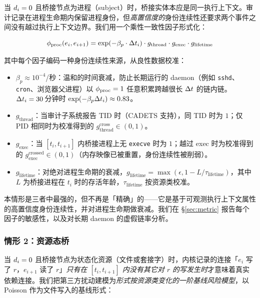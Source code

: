 当 $d_i = 0$ 且桥接节点为进程（subject）时，桥接实体本应是同一执行上下文。审计记录在进程生命期内保留进程身份，但\emph{高置信度的}身份连续性还要求两个事件之间没有越过执行上下文边界。我们用一个乘性一致性因子形式化：

\begin{equation}
\phi_{\text{proc}}(e_i, e_{i+1}) = \exp(-\beta_p \cdot \Delta t_i) \cdot g_{\text{thread}} \cdot g_{\text{exec}} \cdot g_{\text{lifetime}}
\label{eq:phi_proc}
\end{equation}

其中每个因子编码一种身份连续性来源，从良性数据校准：

\begin{itemize}
\item $\beta_p \approx 10^{-4}$/秒：温和的时间衰减，防止长期运行的 daemon（例如 \texttt{sshd}、\texttt{cron}、浏览器父进程）以 $\phi_{\text{proc}}=1$ 任意积累跨越很长 $\Delta t$ 的链内链。$\Delta t_i=30$\,分钟时 $\exp(-\beta_p \Delta t_i) \approx 0.83$。
\item $g_{\text{thread}}$：当审计子系统报告 TID 时（CADETS 支持），同 TID 时为 $1$；仅 PID 相同时为校准得到的 $g_{\text{thread}}^{\text{cross}} \in (0, 1)$。
\item $g_{\text{exec}}$：当 $[t_i, t_{i+1}]$ 内桥接进程上无 \texttt{execve} 时为 $1$；越过 exec 时为校准得到的 $g_{\text{exec}}^{\text{crossed}} \in (0, 1)$（内存映像已被重置，身份连续性被削弱）。
\item $g_{\text{lifetime}}$：对绝对进程生命期的衰减，$g_{\text{lifetime}} = \max(\epsilon, 1 - L / \tau_{\text{lifetime}})$，其中 $L$ 为桥接进程在 $t_i$ 时的存活年龄，$\tau_{\text{lifetime}}$ 按资源类校准。
\end{itemize}

本情形是三者中最强的，但不再是「精确」的——它是基于可观测执行上下文属性的高置信度身份连续性，并对进程生命期做衰减。我们在 \S\ref{sec:metric} 报告每个因子的敏感性，以及对长期 daemon 的虚假链率分析。

\subsubsection{情形 2：资源态桥}
\label{sec:case_res}

当 $d_i = 0$ 且桥接节点为状态化资源（文件或套接字）时，内核记录的连接「$e_i$ 写了 $r$，$e_{i+1}$ 读了 $r$」\emph{只有在 $[t_i, t_{i+1}]$ 内没有其它对 $r$ 的写发生时}才意味着真实依赖连接。我们把第三方扰动建模为\emph{形式按资源类变化的一阶基线风险模型}，以 Poisson 作为文件写入的基线形式：

